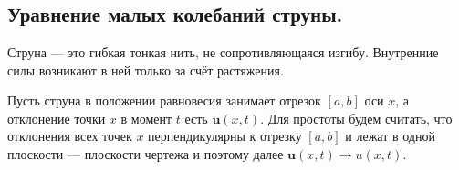 \chapter{}
\label{lecture11}

\section{Уравнение малых колебаний струны.}
\label{lecture11section1}

\begin{Def}
	Струна --- это гибкая тонкая нить, не сопротивляющаяся изгибу. Внутренние силы возникают в ней только за счёт растяжения.
\end{Def}
Пусть струна в положении равновесия занимает отрезок $[a,b]$ оси $x$, а отклонение точки $x$ в момент $t$ есть $\bm{u}(x,t)$. Для простоты будем считать, что отклонения всех точек $x$ перпендикулярны к отрезку $[a,b]$ и лежат в одной плоскости --- плоскости чертежа и поэтому далее $\bm{u}(x,t)\rightarrow u(x,t)$.

